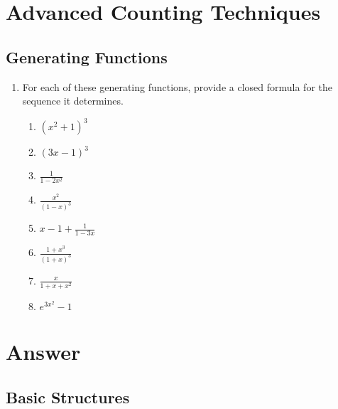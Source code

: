 \documentclass{sig-alternate-05-2015}
\begin{document}
\section{Advanced Counting Techniques}
\subsection{Generating Functions}
\begin{enumerate}
	\item For each of these generating functions, provide a closed
	formula for the sequence it determines.
	\begin{enumerate}
		\item $(x^2 + 1)^3$
		\item $(3x - 1)^3$
		\item $\frac{1}{1 - 2x^2} $
		\item $\frac{x^2}{(1 - x)^3}$
		\item $x - 1 + \frac{1}{1 - 3x}$
		\item $\frac{1 + x^3}{(1 + x)^3}$
		\item $\frac{x}{1 + x + x^2}$
		\item $e^{3x^2} - 1$
	\end{enumerate}
\end{enumerate}

\nocite{*}

 
\clearpage
\appendix
\section{Answer}
\subsection{Basic Structures}
\end{document}
